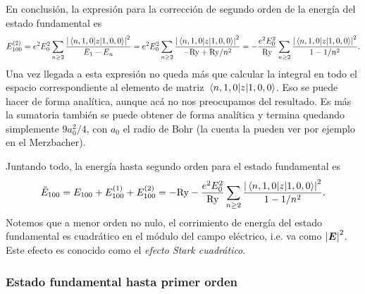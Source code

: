 \documentclass[10pt, a4paper]{article}
\newcommand{\Ry}{\ensuremath{\text{Ry}}}
\numberwithin{equation}{subsection}
\begin{document}
En conclusión, la expresión para la corrección de segundo orden de la energía
del estado fundamental es
\begin{equation}
  E^{(2)}_{100}
  = e^2E_0^2 \sum_{n \geq 2}
    \frac{\abs{\matrixel{n,1,0}{z}{1,0,0}}^2} {E_{1} - E_{n}}
  = e^2E_0^2 \sum_{n \geq 2}
    \frac{\abs{\matrixel{n,1,0}{z}{1,0,0}}^2} {-\Ry + \Ry/n^2}
  = -\frac{e^2E_0^2}{\Ry} \sum_{n \geq 2}
    \frac{\abs{\matrixel{n,1,0}{z}{1,0,0}}^2} {1 - 1/n^2}.
\end{equation}
Una vez llegada a esta expresión no queda más que calcular la integral en todo
el espacio correspondiente al elemento de matriz $\matrixel{n,1,0}{z}{1,0,0}$.
Eso se puede hacer de forma analítica, aunque acá no nos preocupamos del
resultado. Es más la sumatoria también se puede obtener de forma analítica y
termina quedando simplemente $9a_0^2/4$, con $a_0$ el radio de Bohr (la cuenta
la pueden ver por ejemplo en el Merzbacher).

Juntando todo, la energía hasta segundo orden para el estado fundamental es
\begin{equation}
  \tilde{E}_{100}
  = E_{100} + E^{(1)}_{100} + E^{(2)}_{100}
  = -\Ry -\frac{e^2E_0^2}{\Ry} \sum_{n \geq 2}
    \frac{\abs{\matrixel{n,1,0}{z}{1,0,0}}^2} {1 - 1/n^2}.
\end{equation}
Notemos que a menor orden no nulo, el corrimiento de energía del estado
fundamental es cuadrático en el módulo del campo eléctrico, i.e. va como
$\abs{\vb*{E}}^2$. Este efecto es conocido como el \emph{efecto Stark
cuadrático}.

\subsubsection{Estado fundamental hasta primer orden}
\end{document}

